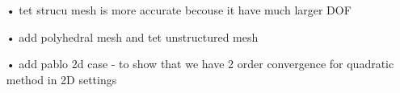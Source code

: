 \documentclass[sn-mathphys,Numbered]{sn-jnl}%
\begin{document}
\begin{itemize}
\item[•] tet strucu mesh is more accurate becouse it have much larger DOF
\item[•] add polyhedral mesh and tet unstructured mesh
\item[•] add pablo 2d case - to show that we have 2 order convergence for quadratic method in 2D settings
\end{itemize}
\begin{figure}[H]
 	\centering
\end{figure}
\end{document}
